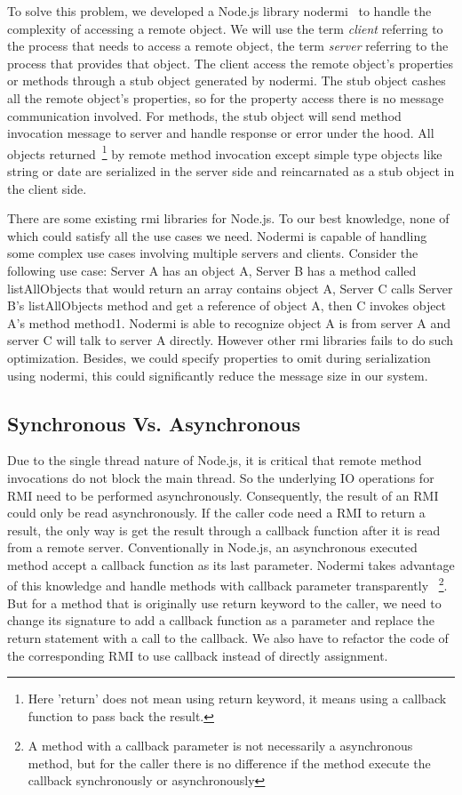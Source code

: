 To solve this problem, 
we developed a Node.js library nodermi~\cite{nodermi} to handle the complexity of accessing a remote object.
We will use the term \emph{client} referring to the process that needs to access a remote object, 
the term \emph{server} referring to the process that provides that object.
The client access the remote object's properties or methods through a stub object generated by nodermi.
The stub object cashes all the remote object's properties, 
so for the property access there is no message communication involved.
For methods,
the stub object will send method invocation message to server and handle response or error under the hood.
All objects returned~\footnote{Here 'return' does not mean using return keyword, it means using a callback function to pass back the result.} by remote method invocation
 except simple type objects like string or date are serialized in the server side
 and reincarnated as a stub object in the client side.

There are some existing rmi libraries for Node.js. 
To our best knowledge, none of which could satisfy all the use cases we need.
Nodermi is capable of handling some complex use cases involving multiple servers and clients.
Consider the following use case:
Server A has an object A, 
Server B has a method called listAllObjects that would return an array contains object A,
Server C calls Server B's listAllObjects method and get a reference of object A,
then C invokes object A's method method1.
Nodermi is able to recognize object A is from server A and server C will talk to server A directly.
However other rmi libraries fails to do such optimization.
Besides, we could specify properties to omit during serialization using nodermi, 
this could significantly reduce the message size in our system.

\subsection{Synchronous Vs. Asynchronous}
Due to the single thread nature of Node.js, 
it is critical that remote method invocations do not block the main thread.
So the underlying IO operations for RMI need to be performed asynchronously.
Consequently, the result of an RMI could only be read asynchronously.
If the caller code need a RMI to return a result,
the only way is get the result through a callback function 
after it is read from a remote server.
Conventionally in Node.js, an asynchronous executed method 
accept a callback function as its last parameter.
Nodermi takes advantage of this knowledge and handle methods with callback parameter transparently
~\footnote{A method with a callback parameter is not necessarily a asynchronous method, 
but for the caller there is no difference if the method execute the callback synchronously or asynchronously}.
But for a method that is originally use return keyword to the caller, 
we need to change its signature to add a callback function as a parameter and 
replace the return statement with a call to the callback. %
We also have to refactor the code of the corresponding RMI to use callback instead of 
directly assignment.



